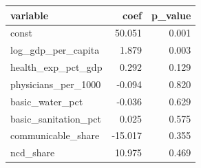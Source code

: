 \begin{tabular}{lrr}
\toprule
variable & coef & p_value \\
\midrule
const & 50.051 & 0.001 \\
log_gdp_per_capita & 1.879 & 0.003 \\
health_exp_pct_gdp & 0.292 & 0.129 \\
physicians_per_1000 & -0.094 & 0.820 \\
basic_water_pct & -0.036 & 0.629 \\
basic_sanitation_pct & 0.025 & 0.575 \\
communicable_share & -15.017 & 0.355 \\
ncd_share & 10.975 & 0.469 \\
\bottomrule
\end{tabular}
